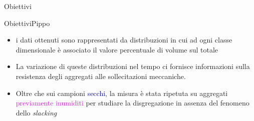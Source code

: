 \documentclass[10pt]{beamer}
\begin{document}
\begin{frame}{Obiettivi}
\begin{frame}{Obiettivi}{Pippo}
\begin{frame}
  \begin{minipage}[ht]{\textwidth}
    \footnotesize
    \begin{itemize}[<+->]
    \item i dati ottenuti sono rappresentati da distribuzioni in cui ad
      ogni classe dimensionale \`e associato il valore percentuale di
      volume sul totale
      \pause
    \item La variazione di queste distribuzioni nel tempo ci fornisce
      informazioni sulla resistenza degli aggregati alle sollecitazioni
      meccaniche.
    \item Oltre che sui campioni \textcolor{blue}{secchi}, la misura \`e
      stata ripetuta su aggregati \textcolor{magenta}{previamente
        inumiditi} per studiare la disgregazione in assenza del fenomeno
      dello \textit{slacking}
    \end{itemize}
  \end{minipage}
  \begin{minipage}[ht]{\textwidth}
    \centering
  \end{minipage}

\end{frame}


\end{frame}
\end{frame}
\end{document}
